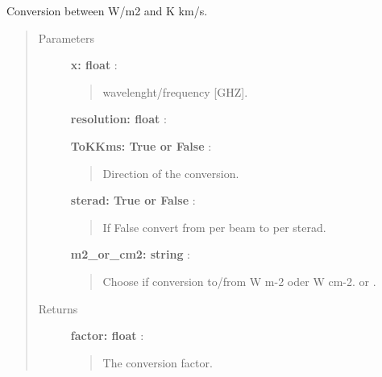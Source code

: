 \documentclass[a4paper,10pt,english]{sphinxmanual}
\begin{document}
\begin{fulllineitems}
\label{functions:astrolyze.functions.units.WmToKkms}
Conversion between W/m2 and K km/s.
\begin{quote}\begin{description}
\item[{Parameters }] \leavevmode
\textbf{x: float} :
\begin{quote}

wavelenght/frequency {[}GHZ{]}.
\end{quote}

\textbf{resolution: float} :

\textbf{ToKKms: True or False} :
\begin{quote}

Direction of the conversion.
\end{quote}

\textbf{sterad: True or False} :
\begin{quote}

If False convert from per beam to per sterad.
\end{quote}

\textbf{m2\_or\_cm2: string} :
\begin{quote}

Choose if conversion to/from W m-2 oder W cm-2.  or .
\end{quote}

\item[{Returns }] \leavevmode
\textbf{factor: float} :
\begin{quote}

The conversion factor.
\end{quote}

\end{description}\end{quote}

\end{fulllineitems}

\end{document}
